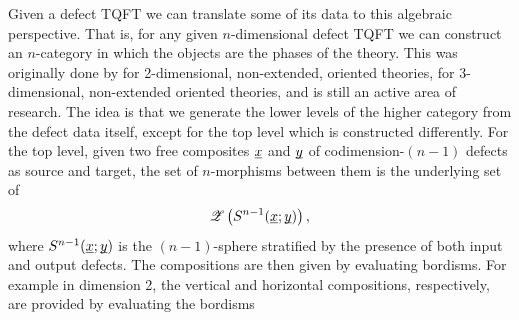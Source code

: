 \documentclass[12pt,a4paper]{article}
\numberwithin{equation}{section}
\begin{document}
Given a defect TQFT we can translate some of its data to this algebraic perspective. That is, for any given $n$-dimensional defect TQFT we can construct an $n$-category in which the objects are the phases of the theory. This was originally done by \cite{dkr} for 2-dimensional, non-extended, oriented theories, \cite{graycat} for 3-dimensional, non-extended oriented theories, and is still an active area of research. The idea is that we generate the lower levels of the higher category from the defect data itself, except for the top level which is constructed differently. For the top level, given two free composites $\underline{\smash x}$ and $\underline{\smash y}$ of codimension-$(n-1)$ defects as source and target, the set of $n$-morphisms between them is the underlying set of
%
\begin{equation}
    \mathscr{Z}\left(S^{n-1}(\underline{\smash x}; \underline{\smash y})\right),
\end{equation}
%
where $S^{n-1}(\underline{\smash x}; \underline{\smash y})$ is the $(n-1)$-sphere stratified by the presence of both input and output defects. The compositions are then given by evaluating bordisms. For example in dimension 2, the vertical and horizontal compositions, respectively, are provided by evaluating the bordisms
%
\vspace{-0.3cm}
\end{document}

